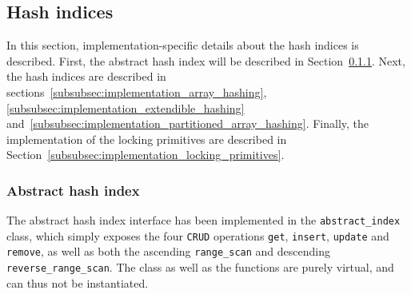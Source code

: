 \documentclass[11pt]{article} %
\begin{document}
\subsection{Hash indices}
\label{subsec:implementation_hashing_indices}
In this section, implementation-specific details about the hash indices is described. First, the abstract hash index will be described in Section~\ref{subsubsec:implementation_abstract_index}. Next, the hash indices are described in sections~\ref{subsubsec:implementation_array_hashing}, \ref{subsubsec:implementation_extendible_hashing} and~\ref{subsubsec:implementation_partitioned_array_hashing}. Finally, the implementation of the locking primitives are described in Section~\ref{subsubsec:implementation_locking_primitives}.
\subsubsection{Abstract hash index}
\label{subsubsec:implementation_abstract_index}
The abstract hash index interface has been implemented in the \verb|abstract_index| class, which simply exposes the four \verb|CRUD| operations \verb|get|, \verb|insert|, \verb|update| and \verb|remove|, as well as both the ascending \verb|range_scan| and descending \verb|reverse_range_scan|. The class as well as the functions are purely virtual, and can thus not be instantiated.
\end{document}
